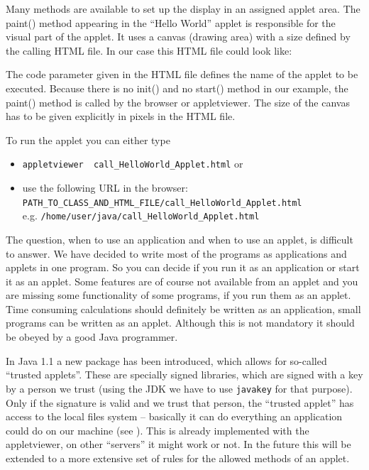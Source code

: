Many methods are available to set up the display in an assigned applet area.
The paint() method appearing in the ``Hello World'' applet is
responsible for the visual part of the applet. It uses a canvas
(drawing area) with a size defined by the calling HTML file. In our case
this HTML file could look like:

The code parameter given in the HTML file defines the name of the applet
to be executed. Because there is no init() and no start() method in our
example, the paint() method is called by the browser or appletviewer.
The size of the canvas has to be given explicitly in pixels in the
HTML file.

To run the applet you can either type
\begin{itemize}
\item \verb|appletviewer  call_HelloWorld_Applet.html| or
\item use the following URL in the browser: \\
        \verb|PATH_TO_CLASS_AND_HTML_FILE/call_HelloWorld_Applet.html| \\
        e.g. \verb|/home/user/java/call_HelloWorld_Applet.html|
\end{itemize}

The question, when to use an application and when to use
an applet, is difficult to answer. We have decided to write most
of the programs as applications and applets in one program. So you
can decide if you run it as an application or start it as an applet.
Some features are of course not available from an applet and
you are missing some functionality of some programs, if you run them
as an applet.
Time consuming calculations should
definitely be written as an application, small programs can be
written as an applet. Although this is not mandatory it should
be obeyed by a good Java programmer.

In Java 1.1 a new package has been introduced, which allows for
so-called ``trusted applets''. These are specially signed libraries,
which are signed with a key by a person we trust 
(using the JDK we have to use \verb|javakey| for that purpose). Only if the
signature is valid and we trust that person, the ``trusted applet''
has access to the local files system -- basically it can do everything
an application could do on our machine (see \cite[page 142]{javanutshell}).
 This is already implemented with
the appletviewer, on other ``servers'' it might work or not. In the
future this will be extended to a more extensive set of rules for the
allowed methods of an applet.

